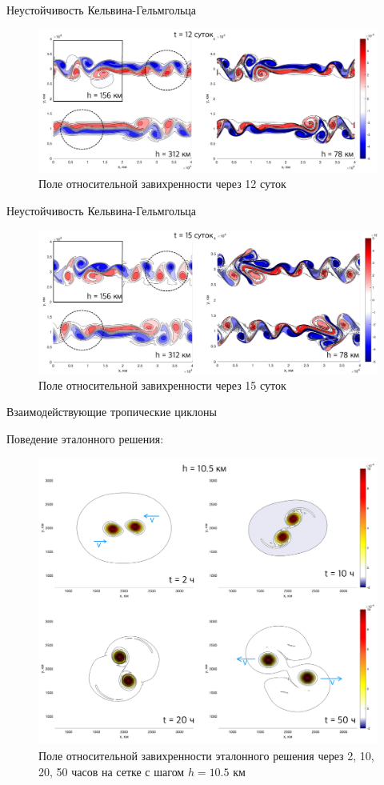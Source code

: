 \documentclass[10pt]{beamer}
\begin{document}
\begin{frame}{Неустойчивость Кельвина-Гельмгольца}
\begin{figure}[h]
\centering
\includegraphics[width=1\linewidth]{./images/kelhelm12.png}
\caption{Поле относительной завихренности через 12 суток}
\label{fig:mpr}
\end{figure}
\end{frame}

\begin{frame}{Неустойчивость Кельвина-Гельмгольца}
\begin{figure}[h]
\centering
\includegraphics[width=1\linewidth]{./images/kelhelm15.png}
\caption{Поле относительной завихренности через 15 суток}
\label{fig:mpr}
\end{figure}
\end{frame}

\begin{frame}{Взаимодействующие тропические циклоны}

Поведение эталонного решения:
\begin{figure}[h]
\centering
\includegraphics[width=0.7\linewidth]{./images/twocycref.png}
\caption{Поле относительной завихренности эталонного решения через 2, 10, 20, 50 часов на сетке с шагом $h = 10.5$ км}
\label{fig:mpr}
\end{figure}

\end{frame}
\end{document}
